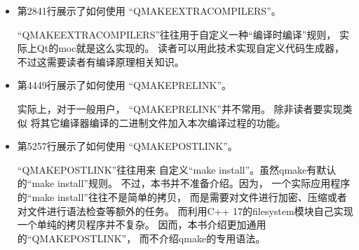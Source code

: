 \begin{itemize}
\item 第28\raisebox{0.16ex}{\sourcefonttwo\~{}}41行展示了如何使用
“QMAKE\underline{\hspace{0.5em}}EXTRA\underline{\hspace{0.5em}}COMPILERS”。

“QMAKE\underline{\hspace{0.5em}}EXTRA\underline{\hspace{0.5em}}COMPILERS”往往用于自定义一种“编译时编译”规则，
实际上Qt的moc就是这么实现的。
读者可以用此技术实现自定义代码生成器，
不过这需要读者有编译原理相关知识。
\item 第44\raisebox{0.16ex}{\sourcefonttwo\~{}}49行展示了如何使用
“QMAKE\underline{\hspace{0.5em}}PRE\underline{\hspace{0.5em}}LINK”。

实际上，对于一般用户，
“QMAKE\underline{\hspace{0.5em}}PRE\underline{\hspace{0.5em}}LINK”并不常用。
除非读者要实现类似
将其它编译器编译的二进制文件加入本次编译过程的功能。
\item 第52\raisebox{0.16ex}{\sourcefonttwo\~{}}57行展示了如何使用
“QMAKE\underline{\hspace{0.5em}}POST\underline{\hspace{0.5em}}LINK”。

“QMAKE\underline{\hspace{0.5em}}POST\underline{\hspace{0.5em}}LINK”往往用来
自定义“make install”。虽然qmake有默认的“make install”规则。
不过，本书并不准备介绍。因为，
一个实际应用程序的“make install”往往不是简单的拷贝，
而是需要对文件进行加密、压缩或者对文件进行语法检查等额外的任务。
而利用C{\sourcefonttwo{}+}{\sourcefonttwo{}+} 17的filesystem模块自己实现一个单纯的拷贝程序并不复杂。
因而，本书介绍更加通用的“QMAKE\underline{\hspace{0.5em}}POST\underline{\hspace{0.5em}}LINK”，
而不介绍qmake的专用语法。
\end{itemize}



